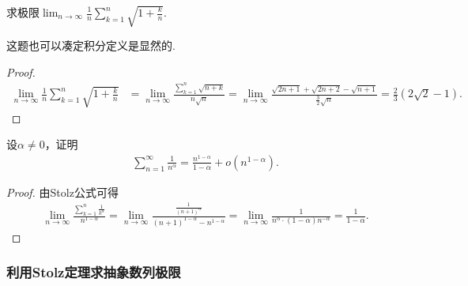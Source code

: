 \documentclass[../../main.tex]{subfiles}%
\begin{document}
\begin{example}
求极限\(\lim_{n\rightarrow\infty}\frac{1}{n}\sum_{k = 1}^{n}\sqrt{1 + \frac{k}{n}}\).
\end{example}
\begin{note}
这题也可以凑定积分定义是显然的.
\end{note}
\begin{proof}

\begin{align*}
\lim_{n\rightarrow\infty}\frac{1}{n}\sum_{k = 1}^{n}\sqrt{1 + \frac{k}{n}}&=\lim_{n\rightarrow\infty}\frac{\sum\limits_{k = 1}^{n}\sqrt{n + k}}{n\sqrt{n}}=\lim_{n\rightarrow\infty}\frac{\sqrt{2n + 1}+\sqrt{2n + 2}-\sqrt{n + 1}}{\frac{3}{2}\sqrt{n}}=\frac{2}{3}(2\sqrt{2}-1).
\end{align*}

\end{proof}

\begin{proposition}\label{proposition:幂次小于1的级数的阶}
设$\alpha \ne 0$，证明
\begin{align*}
\sum_{n=1}^{\infty}{\frac{1}{n^{\alpha}}}=\frac{n^{1-\alpha}}{1-\alpha}+o\left( n^{1-\alpha} \right) .
\end{align*}
\end{proposition}
\begin{proof}

由Stolz公式可得
\begin{align*}
\lim_{n\rightarrow \infty} \frac{\sum\limits_{k=1}^n{\frac{1}{k^{\alpha}}}}{n^{1-\alpha}}=\lim_{n\rightarrow \infty} \frac{\frac{1}{\left( n+1 \right) ^{\alpha}}}{\left( n+1 \right) ^{1-\alpha}-n^{1-\alpha}}=\lim_{n\rightarrow \infty} \frac{1}{n^{\alpha}\cdot \left( 1-\alpha \right) n^{-\alpha}}=\frac{1}{1-\alpha}.
\end{align*}

\end{proof}



\subsubsection{利用Stolz定理求抽象数列极限}
\end{document}
